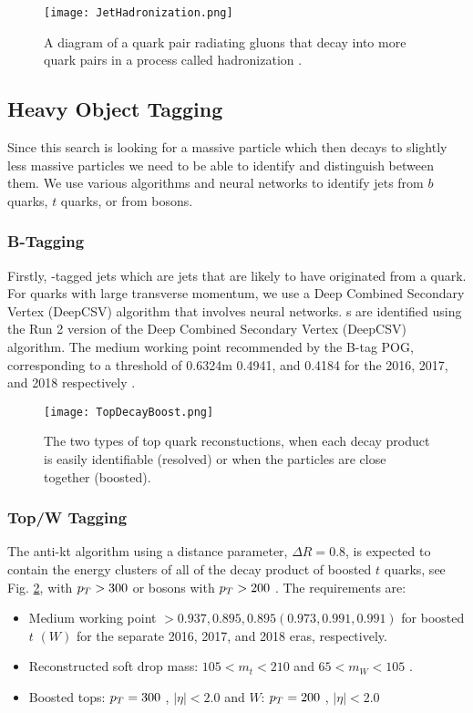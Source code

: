 \begin{figure}
 	\centering
	\texttt{[image: JetHadronization.png]}
 	\caption[Jet Hadronization]{A diagram of a quark pair radiating gluons that decay into more quark pairs in a process called hadronization \cite{griffiths_introduction_2008}.}
 	\label{JetHadronization} 
\end{figure}

\subsection{Heavy Object Tagging}\label{HeavyObject}
Since this search is looking for a massive particle which then decays to slightly less massive particles we need to be able to identify and distinguish between them. We use various algorithms and neural networks to identify jets from $b$ quarks, $t$ quarks, or from \W {} bosons. 

\subsubsection{B-Tagging}\label{Btagging}
Firstly, \B-tagged jets which are jets that are likely to have originated from a \B{} quark. For \B{} quarks with large transverse momentum, we use a Deep Combined Secondary Vertex (DeepCSV) algorithm that involves neural networks. \bjet s{} are identified using the Run 2 version of the Deep Combined Secondary Vertex (DeepCSV) algorithm. The medium working point recommended by the B-tag POG, corresponding to a threshold of 0.6324m 0.4941, and 0.4184 for the 2016, 2017, and 2018 respectively \cite{noauthor_btagrecommendation2016legacy_nodate, noauthor_btagrecommendation94x_nodate, noauthor_btagrecommendation102x_nodate}.

\begin{figure}
 	\centering
	\texttt{[image: TopDecayBoost.png]}
 	\caption[Top Decays]{The two types of top quark reconstuctions, when each decay product is easily identifiable (resolved) or when the particles are close together (boosted).}
 	\label{TopDecays} 
\end{figure}

\subsubsection{Top/W Tagging}\label{TopTagging}
The anti-kt algorithm using a distance parameter, $\Delta R=0.8$, is expected to contain the energy clusters of all of the decay product of boosted $t$ quarks, see Fig. \ref{TopDecays}, with $p_{T}>300$ \GeV{} or \W{} bosons with $p_{T}>200$ \GeV. The requirements are:
\begin{itemize}
	\item Medium working point $>0.937, 0.895, 0.895 (0.973, 0.991, 0.991)$ for boosted $t$ $(W)$ for the separate 2016, 2017, and 2018 eras, respectively.
	\item Reconstructed soft drop mass: $105<m_t<210$ \GeV{} and $65<m_W<105$ \GeV.
	\item Boosted tops: $p_{T}=300$ \GeV, $|\eta|<2.0$ and $W$: $p_{T}=200$ \GeV, $|\eta|<2.0$
\end{itemize}

